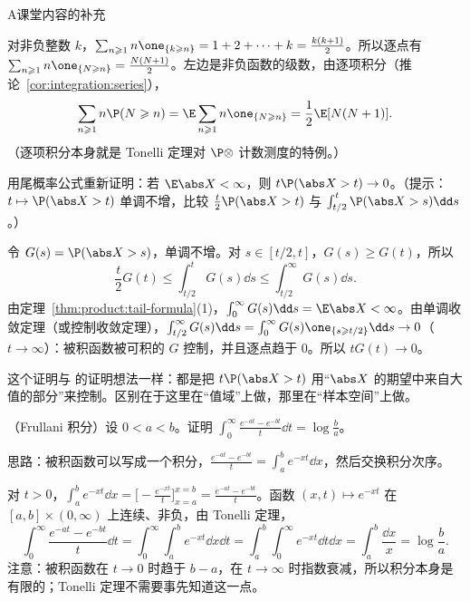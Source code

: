 \begin{exercises}{A}{课堂内容的补充}
\begin{questions}
\begin{solution}
对非负整数 $k$，$\sum_{n\geqslant1}n\one_{\{k\geqslant n\}}=1+2+\cdots+k=\frac{k(k+1)}2$。所以逐点有 $\sum_{n\geqslant1}n\one_{\{N\geqslant n\}}=\frac{N(N+1)}2$。左边是非负函数的级数，由逐项积分（推论~\ref{cor:integration:series}），
\[
\sum_{n\geqslant1}n\P(N\geqslant n)=\E\sum_{n\geqslant1}n\one_{\{N\geqslant n\}}=\frac12\E[N(N+1)].
\]
（逐项积分本身就是 Tonelli 定理对 $\P\otimes$ 计数测度的特例。）
\end{solution}
\end{questions}

\item\label{ex:product:A6} 用尾概率公式重新证明：若 $\E\abs X<\infty$，则 $t\P(\abs X>t)\to0$。（提示：$t\mapsto \P(\abs X>t)$ 单调不增，比较 $\frac t2\P(\abs X>t)$ 与 $\int_{t/2}^t\P(\abs X>s)\dd s$。）
\begin{solution}
令 $G(s)=\P(\abs X>s)$，单调不增。对 $s\in[t/2,t]$，$G(s)\geqslant G(t)$，所以
\[
\frac t2G(t)\leqslant\int_{t/2}^tG(s)\dd s\leqslant\int_{t/2}^\infty G(s)\dd s .
\]
由定理~\ref{thm:product:tail-formula}(1)，$\int_0^\infty G(s)\dd s=\E\abs X<\infty$。由单调收敛定理（或控制收敛定理），$\int_{t/2}^\infty G(s)\dd s=\int_0^\infty G(s)\one_{\{s\geqslant t/2\}}\dd s\to0$（$t\to\infty$）：被积函数被可积的 $G$ 控制，并且逐点趋于 $0$。所以 $tG(t)\to0$。

这个证明与 的证明想法一样：都是把 $t\P(\abs X>t)$ 用“$\abs X$ 的期望中来自大值的部分”来控制。区别在于这里在“值域”上做，那里在“样本空间”上做。
\end{solution}

\item\label{ex:product:A7} （Frullani 积分）设 $0<a<b$。证明 $\displaystyle\int_0^\infty\frac{e^{-at}-e^{-bt}}t\dd t=\log\frac ba$。
\begin{solution}
思路：被积函数可以写成一个积分，$\frac{e^{-at}-e^{-bt}}t=\int_a^be^{-xt}\dd x$，然后交换积分次序。

对 $t>0$，$\int_a^be^{-xt}\dd x=\bigl[-\frac{e^{-xt}}t\bigr]_{x=a}^{x=b}=\frac{e^{-at}-e^{-bt}}t$。函数 $(x,t)\mapsto e^{-xt}$ 在 $[a,b]\times(0,\infty)$ 上连续、非负，由 Tonelli 定理，
\[
\int_0^\infty\frac{e^{-at}-e^{-bt}}t\dd t=\int_0^\infty\int_a^be^{-xt}\dd x\dd t=\int_a^b\int_0^\infty e^{-xt}\dd t\dd x=\int_a^b\frac{\dd x}x=\log\frac ba .
\]
注意：被积函数在 $t\to0$ 时趋于 $b-a$，在 $t\to\infty$ 时指数衰减，所以积分本身是有限的；Tonelli 定理不需要事先知道这一点。
\end{solution}
\end{exercises}

